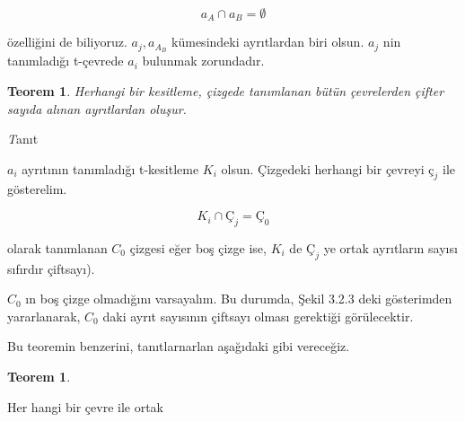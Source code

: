 \documentclass{article}
\newtheorem{cor}[theorem]{Teorem}
\begin{document}
$$a_A \cap a_B = \emptyset$$

özelliğini de biliyoruz. $a_j, a_A_B$ kümesindeki
ayrıtlardan biri olsun. $a_j$ nin tanımladığı
t-çevrede $a_i$ bulunmak zorundadır.
\setcounter{section}{3}
\setcounter{subsection}{2}
\setcounter{theorem}{9}
\begin{cor}
Herhangi bir kesitleme, çizgede
tanımlanan bütün çevrelerden
çifter sayıda alınan ayrıtlardan
oluşur. 
\end{cor}

\textit Tanıt

$a_i$ ayrıtının tanımladığı t-kesitleme $K_i$ olsun.
Çizgedeki herhangi bir çevreyi $ç_j$ ile
gösterelim. 

$$K_i \cap Ç_j = Ç_0$$

olarak tanımlanan $C_0$ çizgesi eğer boş çizge ise,
$K_i$ de $Ç_j$ ye ortak ayrıtların sayısı sıfırdır
çiftsayı).

$C_0$ ın boş çizge olmadığını varsayalım. Bu
durumda, Şekil 3.2.3 deki gösterimden yararlanarak,
$C_0$ daki ayrıt sayısının çiftsayı olması
gerektiği görülecektir.

Bu teoremin benzerini, tanıtlarnarlan aşağıdaki gibi
vereceğiz. 

\begin{cor}

\end{cor}
Her hangi bir çevre ile ortak
\end{document}

